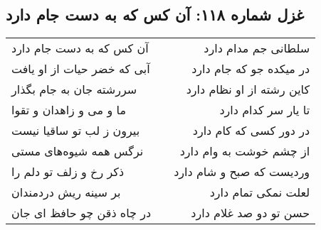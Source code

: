 \begin{center}
\section*{غزل شماره ۱۱۸: آن کس که به دست جام دارد}
\label{sec:sh118}
\begin{longtable}{l p{0.5cm} r}
آن کس که به دست جام دارد
&&
سلطانی جم مدام دارد
\\
آبی که خضر حیات از او یافت
&&
در میکده جو که جام دارد
\\
سررشته جان به جام بگذار
&&
کاین رشته از او نظام دارد
\\
ما و می و زاهدان و تقوا
&&
تا یار سر کدام دارد
\\
بیرون ز لب تو ساقیا نیست
&&
در دور کسی که کام دارد
\\
نرگس همه شیوه‌های مستی
&&
از چشم خوشت به وام دارد
\\
ذکر رخ و زلف تو دلم را
&&
وردیست که صبح و شام دارد
\\
بر سینه ریش دردمندان
&&
لعلت نمکی تمام دارد
\\
در چاه ذقن چو حافظ ای جان
&&
حسن تو دو صد غلام دارد
\\
\end{longtable}
\end{center}
